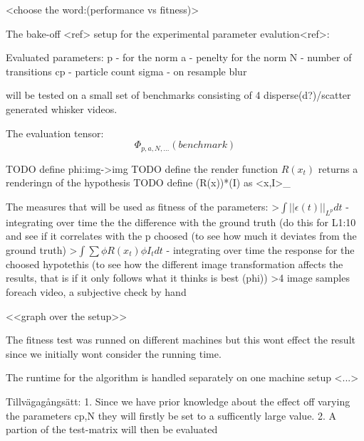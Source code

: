 
<choose the word:(performance vs fitness)>

The bake-off <ref> setup for the experimental parameter evalution<ref>:

Evaluated parameters:
    p     - for the norm
    a     - penelty for the norm
    N     - number of transitions
    cp    - particle count
    sigma - on resample blur

will be tested on a small set of benchmarks consisting of 4 disperse(d?)/scatter generated whisker videos.

The evaluation tensor:
\begin{equation}
    \Phi_{p,a,N,...}(benchmark)
\end{equation}

TODO define phi:img->img
TODO define the render function $R(x_t)$ returns a renderingn of the hypothesis
TODO define \phi(R(x))*\phi(I) as <x,I>_\phi

The measures that will be used as fitness of the parameters:
    >$\int{||\epsilon(t)||_{L^p}}dt$ - integrating over time the the difference
    with the ground truth (do this for L{1:10} and see if it correlates with
    the p choosed (to see how much it deviates from the ground truth)
    >$\int{\sum{\phi{R(x_t)}\phi{I_t}} }dt$ - integrating over time the response
    for the choosed hypotethis (to see how the different image transformation
        affects the results, that is if it only follows what it thinks is best
        (phi))
    >4 image samples foreach video, a subjective check by hand

<<graph over the setup>>

The fitness test was runned on different machines but this wont effect the
result since we initially wont consider the running time.

The runtime for the algorithm is handled separately on one machine setup <...>



Tillvägagångsätt:
1. Since we have prior knowledge about the effect off varying the parameters cp,N
they will firstly be set to a sufficently large value.
2. A partion of the test-matrix will then be evaluated 
